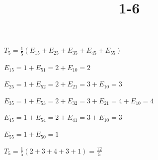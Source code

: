 \documentclass{article}
\title{1-6}
\begin{document}
\maketitle

$T_5 = \frac{1}{5} (E_{15} + E_{25} + E_{35} + E_{45} + E_{55})$

$E_{15} = 1 + E_{51} = 2 + E_{10} = 2$

$E_{25} = 1 + E_{52} = 2 + E_{21} = 3 + E_{10} = 3$

$E_{35} = 1 + E_{53} = 2 + E_{32} = 3 + E_{21} = 4 + E_{10} = 4$

$E_{45} = 1 + E_{54} = 2 + E_{41} = 3 + E_{10} = 3$

$E_{55} = 1 + E_{50} = 1$

$T_5 = \frac{1}{5} (2 + 3 + 4 + 3 + 1) = \frac{12}{5}$
\end{document}
